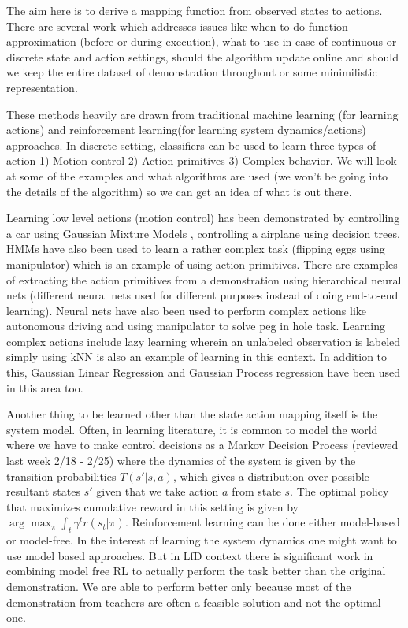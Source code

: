 \documentclass{article}[11pt]
\begin{document}
The aim here is to derive a mapping function from observed states to actions. There are several work which addresses issues like when to do function approximation (before or during execution), what to use in case of continuous or discrete state and action settings, should the algorithm update online and should we keep the entire dataset of demonstration throughout or some minimilistic representation.

These methods heavily are drawn from traditional machine learning (for learning actions) and reinforcement learning(for learning system dynamics/actions) approaches. In discrete setting, classifiers can be used to learn three types of action 1) Motion control 2) Action primitives 3) Complex behavior. We will look at some of the examples and what algorithms are used (we won't be going into the details of the algorithm) so we can get an idea of what is out there. 

Learning low level actions (motion control) has been demonstrated by controlling a car using Gaussian Mixture Models \cite{car}, controlling a airplane using decision trees. HMMs have also been used to learn a rather complex task (flipping eggs using manipulator) which is an example of using action primitives. There are examples of extracting the action primitives from a demonstration using hierarchical neural nets (different neural nets used for different purposes instead of doing end-to-end learning). Neural nets have also been used to perform complex actions like autonomous driving and using manipulator to solve peg in hole task. Learning complex actions include lazy learning wherein an unlabeled observation is labeled simply using kNN is also an example of learning in this context. In addition to this, Gaussian Linear Regression and Gaussian Process regression have been used in this area too.

Another thing to be learned other than the state action mapping itself is the system model. Often, in learning literature, it is common to model the world where we have to make control decisions as a Markov Decision Process (reviewed last week 2/18 - 2/25) where the dynamics of the system is given by the transition probabilities $T(s'|s,a)$, which gives a distribution over possible resultant states $s'$ given that we take action $a$ from state $s$. The optimal policy that maximizes cumulative reward in this setting is given by $\arg \max_\pi \int_t \gamma^tr(s_t|\pi)$. Reinforcement learning can be done either model-based or model-free. In the interest of learning the system dynamics one might want to use model based approaches. But in LfD context there is significant work in combining model free RL to actually perform the task better than the original demonstration. We are able to perform better only because most of the demonstration from teachers are often a feasible solution and not the optimal one. 
\end{document}

